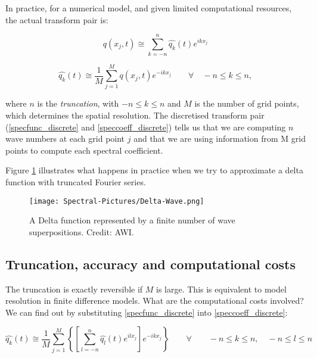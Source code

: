 In practice, for a numerical model, and given limited computational resources, the actual transform pair is:

\begin{equation}
	q(x_j,t) \cong \sum_{k=-n}^{n} \widehat{q_k}(t)e^{ikx_j}
	\label{specfunc_discrete}
\end{equation}

\begin{equation}
	\widehat{q_k}(t) \cong  \frac{1}{M}  \sum_{j=1}^{M} q(x_j,t) e^{-ikx_j} \qquad  \forall \quad -n \le k \le n,
		\label{speccoeff_discrete}
\end{equation}

 where $n$ is the \emph{truncation}, with $-n \le k \le n$  and $M$ is the number of grid points, which determines the spatial resolution. The discretised transform pair (\ref{specfunc_discrete} and \ref{speccoeff_discrete}) tells us that we are computing $n$ wave numbers at each grid point $j$ and that we are using information from M grid points to compute each spectral coefficient. 
 
 Figure \ref{fig:Delta-Wave} illustrates what happens in practice when we try to approximate a delta function with truncated Fourier series.
 
 \begin{figure}[h!]
 	\begin{center}
 		\texttt{[image: Spectral-Pictures/Delta-Wave.png]}
 	\end{center}
 	\label{fig:Delta-Wave}
 	\caption{A Delta function represented by a finite number of wave superpositions. Credit: AWI.}
 \end{figure}
 

 \subsection{Truncation, accuracy and computational costs}
 The truncation is exactly reversible if $M$ is large. This is equivalent to model resolution in finite difference models. What are the computational costs involved? We can find out by substituting \ref{specfunc_discrete} into \ref{speccoeff_discrete}:
 
 \begin{equation}
 	\widehat{q_k}(t) \cong  \frac{1}{M} \sum_{j=1}^{M}  \left\{  \left[   \sum_{l=-n}^{n} \widehat{q_l}(t) e^{ilx_j}  \right]  e^{-ikx_j}  \right\}  \qquad  \forall \qquad -n \le k \le n,  \quad -n \le l \le n
 	\label{spectral_costs}
 \end{equation}

